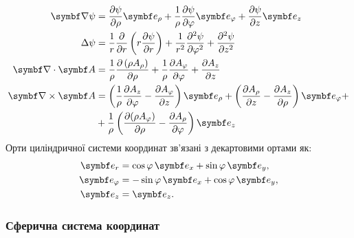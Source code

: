 \begin{align}\label{cylindric}
		\vect{\nabla}\psi & = \frac{\partial \psi}{\partial \rho} \vect{e}_{\rho} + \frac{1}{\rho}\frac{\partial \psi}{\partial \phi} \vect{e}_{\phi} + \frac{\partial \psi}{\partial z} \vect{e}_{z}                                                                                       \\
	\Laplasian\psi    & = \frac{1}{r} \frac{\partial }{\partial r} \left( r \frac{\partial \psi}{\partial r} \right) + \frac{1}{r^2} \frac{\partial^2 \psi}{\partial \phi^2} + \frac{\partial^2 \psi}{\partial z^2}                                                                   \\
	\divg\vect{A}     & = \frac{1}{\rho}\frac{\partial \left(\rho A_{\rho }\right)}{\partial \rho }+\frac{1}{\rho }\frac{\partial A_{\phi } }{\partial \phi }+\frac{\partial A_{z}}{\partial z}                                                                                    \\
	\rot\vect{A}      & =\left({\frac {1}{\rho }}{\frac {\partial A_{z}}{\partial \phi }}-{\frac {\partial A_{\phi }}{\partial z}}\right)\vect{e}_{\rho}+\left({\frac {\partial A_{\rho }}{\partial z}}-{\frac {\partial A_{z}}{\partial \rho }}\right)\vect{e}_{\phi} + \nonumber \\
	                  & +
	{\frac {1}{\rho }}\left({\frac {\partial (\rho A_{\phi })}{\partial \rho }}-{\frac {\partial A_{\rho }}{\partial \phi }}\right)\vect{e}_{z}
\end{align}
Орти циліндричної системи координат зв'язані з декартовими ортами як:
\begin{align}\label{}
    \vect{e}_r &= \cos\phi\, \vect{e}_x + \sin\phi\, \vect{e}_y, \\
    \vect{e}_{\phi} &= -\sin\phi\, \vect{e}_x + \cos\phi\, \vect{e}_y, \\
    \vect{e}_{z} &= \vect{e}_z.
\end{align}

\subsubsection{Сферична система координат}

